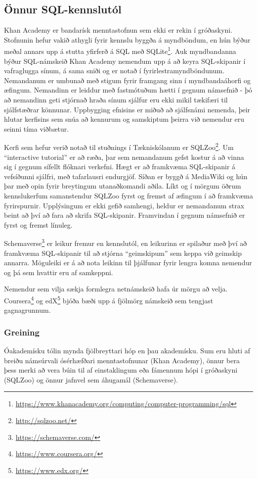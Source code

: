 \documentclass[a4paper,12pt,twoside,BCOR=10mm]{scrbook}
\begin{document}
\subsection{Önnur SQL-kennslutól}
Khan Academy er bandarísk menntastofnun sem ekki er rekin í gróðaskyni. Stofnunin hefur vakið athygli fyrir kennslu byggða á myndböndum, en hún býður meðal annars upp á stutta yfirferð á SQL með SQLite\footnote{\url{https://www.khanacademy.org/computing/computer-programming/sql}}. Auk myndbandanna býður SQL-námskeið Khan Academy nemendum upp á að keyra SQL-skipanir í vafraglugga sínum, á sama sniði og er notað í fyrirlestramyndböndunum. Nemandanum er umbunað með stigum fyrir framgang sinn í myndbandaáhorfi og æfingum. Nemandinn er leiddur með fastmótuðum hætti í gegnum námsefnið - þó að nemandinn geti stjórnað hraða sínum sjálfur eru ekki mikil tækifæri til sjálfstæðrar könnunar. Uppbygging efnisins er miðuð að sjálfsnámi nemenda, þeir hlutar kerfisins sem snúa að kennurum og samskiptum þeirra við nemendur eru seinni tíma viðbætur.

Kerfi sem hefur verið notað til stuðnings í Tækniskólanum er SQLZoo\footnote{\url{http://sqlzoo.net/}}. Um ``interactive tutorial'' er að ræða, þar sem nemandanum gefst kostur á að vinna sig í gegnum sífellt flóknari verkefni. Hægt er að framkvæma SQL-skipanir á vefsíðunni sjálfri, með tafarlausri endurgjöf. Síðan er byggð á MediaWiki og hún þar með opin fyrir breytingum utanaðkomandi aðila.
Líkt og í mörgum öðrum kennslukerfum samanstendur SQLZoo fyrst og fremst af æfingum í að framkvæma fyrirspurnir. Upplýsingum er ekki gefið samhengi, heldur er nemandanum strax beint að því að fara að skrifa SQL-skipanir. Framvindan í gegnum námsefnið er fyrst og fremst línuleg.

Schemaverse\footnote{\url{https://schemaverse.com/}} er leikur fremur en kennslutól, en leikurinn er spilaður með því að framkvæma SQL-skipanir til að stjórna ``geimskipum'' sem keppa við geimskip annarra. Möguleiki er á að nota leikinn til þjálfunar fyrir lengra komna nemendur og þá sem hvattir eru af samkeppni.

Nemendur sem vilja sækja formlegra netnámskeið hafa úr mörgu að velja. Coursera\footnote{\url{https://www.coursera.org/}} og edX\footnote{\url{https://www.edx.org/}} bjóða bæði upp á fjölmörg námskeið sem tengjast gagnagrunnum.

\subsubsection{Greining}
Óakademísku tólin mynda fjölbreyttari hóp en þau akademísku. Sum eru hluti af breiðu námsúrvali ósérhæfðari menntastofnunar (Khan Academy), önnur bera þess merki að vera búin til af einstaklingum eða fámennum hópi í gróðaskyni (SQLZoo) og önnur jafnvel sem áhugamál (Schemaverse).
\end{document}
